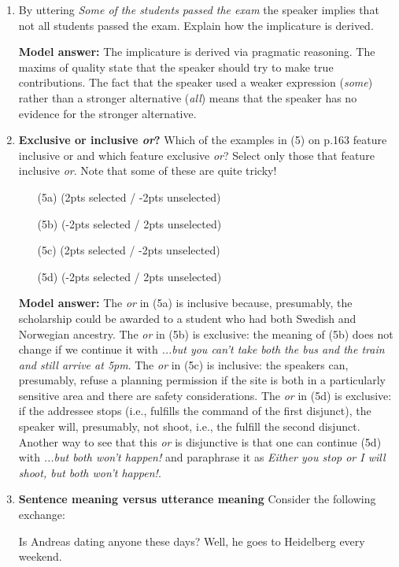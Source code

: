 \documentclass[a4,11pt]{article}
\newcommand{\6}{\mbox{$[\hspace*{-.6mm}[$}}
\newcommand{\9}{\mbox{$]\hspace*{-.6mm}]$}}
\begin{document}
\begin{enumerate}[leftmargin = 12pt]
\item By uttering {\it Some of the students passed the exam} the speaker implies that not all students passed the exam. Explain how the implicature is derived.

{ \bf Model answer:}  The implicature is derived via pragmatic reasoning. The maxims of quality state that the speaker should try to make true contributions. The fact that the speaker used a weaker expression (\textit{some}) rather than a stronger alternative (\textit{all}) means that the speaker has no evidence for the stronger alternative. 

\item {\bf Exclusive or inclusive {\em or}?} Which of the examples in (5) on p.163 feature inclusive or and which feature exclusive {\em or}? Select only those that feature inclusive {\em or}. Note that some of these are quite tricky! 

\begin{enumerate}[noitemsep]
\item[(5a)] (2pts selected / -2pts unselected)
\item[(5b)] (-2pts selected / 2pts unselected)
\item[(5c)] (2pts selected / -2pts unselected)
\item[(5d)] (-2pts selected / 2pts unselected)
\end{enumerate}

{\bf Model answer:} The {\em or} in (5a) is inclusive because, presumably, the scholarship could be awarded to a student who had both Swedish and Norwegian ancestry. The {\em or} in (5b) is exclusive: the meaning of (5b) does not change if we continue it with {\em ...but you can't take both the bus and the train and still arrive at 5pm}. The {\em or} in (5c) is inclusive: the speakers can, presumably, refuse a planning permission if the site is both in a particularly sensitive area and there are safety considerations. The {\em or} in (5d) is exclusive: if the addressee stops (i.e., fulfills the command of the first disjunct), the speaker will, presumably, not shoot, i.e., the fulfill the second disjunct. Another way to see that this {\em or} is disjunctive is that one can continue (5d) with {\em ...but both won't happen!} and paraphrase it as {\em Either you stop or I will shoot, but both won't happen!}. 

\item {\bf Sentence meaning versus utterance meaning}  Consider the following exchange:

\begin{exe}
 Is Andreas dating anyone these days?
 Well, he goes to Heidelberg every weekend.
\end{exe}


\end{enumerate}
\end{document}
